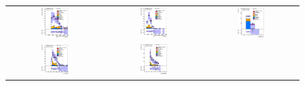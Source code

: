 \clearpage
\begin{figure}[htbp]
\begin{center}
\begin{tabular}{ccc}
%
\includegraphics[width=0.30\textwidth]{appendices/figures/sdrs/JetPtB1_ELEMUONCR3_1W_NOMINAL.eps}  &
\includegraphics[width=0.30\textwidth]{appendices/figures/sdrs/JetPtB2_ELEMUONCR3_1W_NOMINAL.eps} &
\includegraphics[width=0.30\textwidth]{appendices/figures/sdrs/nWhad_ELEMUONCR3_1W_NOMINAL_logscale.eps} \\
\includegraphics[width=0.30\textwidth]{appendices/figures/sdrs/VLQAna_WbX_W1Pt_ELEMUONCR3_1W_NOMINAL.eps} &
\includegraphics[width=0.30\textwidth]{appendices/figures/sdrs/VLQAna_WbX_DRLepMet_ELEMUONCR3_1W_NOMINAL.eps} &

\end{tabular}
\end{center}
\end{figure}
